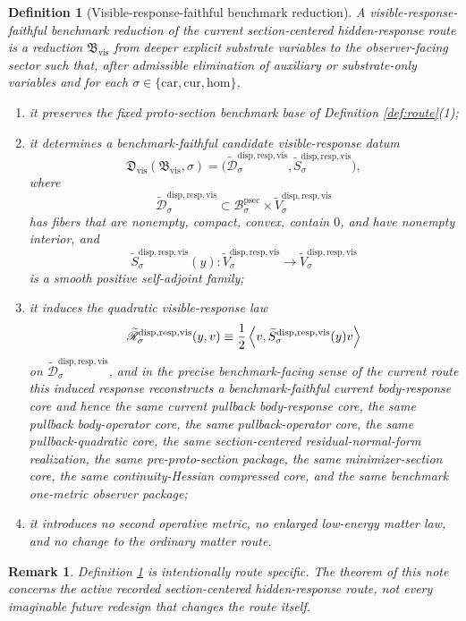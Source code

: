 \documentclass[11pt]{article}
\newcommand{\Car}{\mathrm{car}}
\newcommand{\Cur}{\mathrm{cur}}
\newcommand{\Hom}{\mathrm{hom}}
\newcommand{\ProtoSectionBody}[1]{\mathcal B_{#1}^{\mathrm{psec}}}
\newcommand{\VisibleReduction}{\mathfrak B_{\mathrm{vis}}}
\newcommand{\VisibleDatum}{\mathfrak D_{\mathrm{vis}}}
\newcommand{\CandidateVisibleSpace}[1]{\widetilde V_{#1}^{\mathrm{disp,resp,vis}}}
\newcommand{\CandidateVisibleBody}[1]{\widetilde{\mathcal D}_{#1}^{\mathrm{disp,resp,vis}}}
\newcommand{\CandidateVisibleOperator}[1]{\widetilde S_{#1}^{\mathrm{disp,resp,vis}}}
\newcommand{\CandidateVisibleResponse}[1]{\widetilde{\mathscr R}_{#1}^{\mathrm{disp,resp,vis}}}
\newtheorem{definition}{Definition}
\newtheorem{remark}{Remark}
\begin{document}
\begin{definition}[Visible-response-faithful benchmark reduction]
\label{def:reduction}
A \emph{visible-response-faithful benchmark reduction} of the current section-centered hidden-response route is a reduction \(\VisibleReduction\) from deeper explicit substrate variables to the observer-facing sector such that, after admissible elimination of auxiliary or substrate-only variables and for each \(\sigma\in\{\Car,\Cur,\Hom\}\),
\begin{enumerate}
    \item it preserves the fixed proto-section benchmark base of Definition \ref{def:route}(1);
    \item it determines a benchmark-faithful candidate visible-response datum
    \[
    \VisibleDatum(\VisibleReduction,\sigma)
    =
    \bigl(
    \CandidateVisibleBody{\sigma},
    \CandidateVisibleOperator{\sigma}
    \bigr),
    \]
    where
    \[
    \CandidateVisibleBody{\sigma}
    \subset
    \ProtoSectionBody{\sigma}\times\CandidateVisibleSpace{\sigma}
    \]
    has fibers that are nonempty, compact, convex, contain \(0\), and have nonempty interior, and
    \[
    \CandidateVisibleOperator{\sigma}(y):
    \CandidateVisibleSpace{\sigma}\to\CandidateVisibleSpace{\sigma}
    \]
    is a smooth positive self-adjoint family;
    \item it induces the quadratic visible-response law
    \[
    \CandidateVisibleResponse{\sigma}(y,v)
    \equiv
    \frac{1}{2}
    \ev{v,\CandidateVisibleOperator{\sigma}(y)v}
    \]
    on \(\CandidateVisibleBody{\sigma}\), and in the precise benchmark-facing sense of the current route this induced response reconstructs a benchmark-faithful current body-response core and hence the same current pullback body-response core, the same pullback body-operator core, the same pullback-operator core, the same pullback-quadratic core, the same section-centered residual-normal-form realization, the same pre-proto-section package, the same minimizer-section core, the same continuity-Hessian compressed core, and the same benchmark one-metric observer package;
    \item it introduces no second operative metric, no enlarged low-energy matter law, and no change to the ordinary matter route.
\end{enumerate}
\end{definition}

\begin{remark}
Definition \ref{def:reduction} is intentionally route specific. The theorem of this note concerns the active recorded section-centered hidden-response route, not every imaginable future redesign that changes the route itself.
\end{remark}
\end{document}
